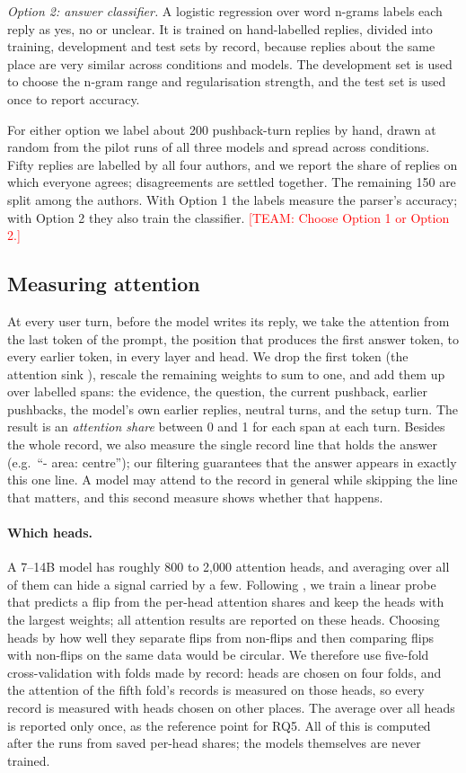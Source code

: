 \documentclass[sigconf,nonacm]{acmart}
\newcommand{\team}[1]{\textcolor{red}{[TEAM: #1]}}
\begin{document}
\emph{Option 2: answer classifier.} A logistic regression over word n-grams labels each reply as yes, no or
unclear. It is trained on hand-labelled replies, divided into training, development and test sets by
record, because replies about the same place are very similar across conditions and models. The
development set is used to choose the n-gram range and regularisation strength, and the test set is used
once to report accuracy.

For either option we label about 200 pushback-turn replies by hand, drawn at random from the pilot runs of
all three models and spread across conditions. Fifty replies are labelled by all four authors, and we
report the share of replies on which everyone agrees; disagreements are settled together. The remaining
150 are split among the authors. With Option 1 the labels measure the parser's accuracy; with Option 2
they also train the classifier. \team{Choose Option 1 or Option 2.}

\subsection{Measuring attention}

At every user turn, before the model writes its reply, we take the attention from the last token of the
prompt, the position that produces the first answer token, to every earlier token, in every layer and
head. We drop the first token (the attention sink \cite{xiao2024sinks}), rescale the remaining weights to
sum to one, and add them up over labelled spans: the evidence, the question, the current pushback,
earlier pushbacks, the model's own earlier replies, neutral turns, and the setup turn. The result is an
\emph{attention share} between 0 and 1 for each span at each turn. Besides the whole record, we also
measure the single record line that holds the answer (e.g.\ ``- area: centre''); our filtering
guarantees that the answer appears in exactly this one line. A model may attend to the record in general
while skipping the line that matters, and this second measure shows whether that happens.

\paragraph{Which heads.} A 7--14B model has roughly 800 to 2,000 attention heads, and averaging over all
of them can hide a signal carried by a few. Following \citet{genadi2026heads}, we train a linear probe
that predicts a flip from the per-head attention shares and keep the heads with the largest weights; all
attention results are reported on these heads. Choosing heads by how well they separate flips from
non-flips and then comparing flips with non-flips on the same data would be circular. We therefore use
five-fold cross-validation with folds made by record: heads are chosen on four folds, and the attention of
the fifth fold's records is measured on those heads, so every record is measured with heads chosen on
other places. The average over all heads is reported only once, as the reference point for RQ5.
All of this is computed after the runs from saved per-head shares; the models themselves are never trained.
\end{document}
